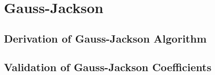 \chapter{Gauss-Jackson}\label{app:gauss_jackson}

\section{Derivation of Gauss-Jackson Algorithm}\label{app:gj_deriv}


\section{Validation of Gauss-Jackson Coefficients}


